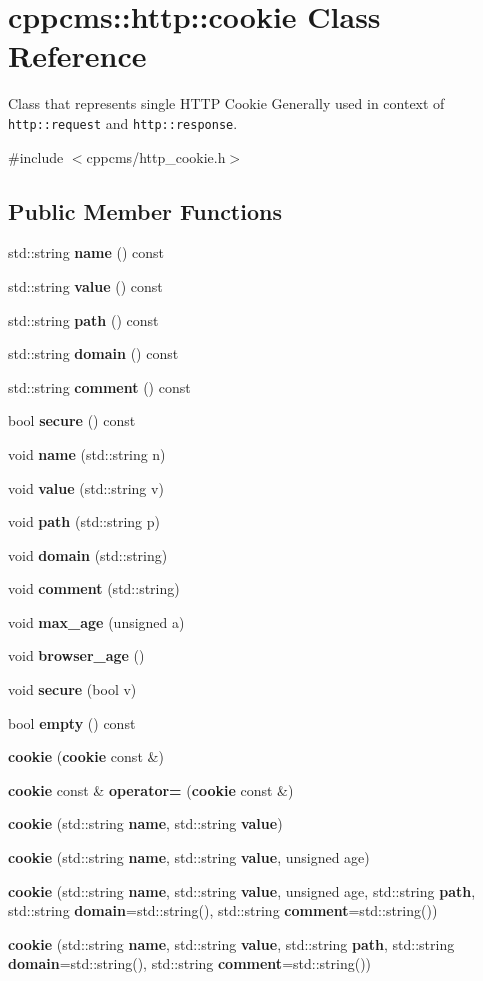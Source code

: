 \section{cppcms\-:\-:http\-:\-:cookie \-Class \-Reference}
\label{classcppcms_1_1http_1_1cookie}


\-Class that represents single \-H\-T\-T\-P \-Cookie \-Generally used in context of {\tt http\-::request} and {\tt http\-::response}.  




{\ttfamily \#include $<$cppcms/http\-\_\-cookie.\-h$>$}

\subsection*{\-Public \-Member \-Functions}
\begin{DoxyCompactItemize}
\item 
std\-::string {\bf name} () const 
\item 
std\-::string {\bf value} () const 
\item 
std\-::string {\bf path} () const 
\item 
std\-::string {\bf domain} () const 
\item 
std\-::string {\bf comment} () const 
\item 
bool {\bf secure} () const 
\item 
void {\bf name} (std\-::string n)
\item 
void {\bf value} (std\-::string v)
\item 
void {\bf path} (std\-::string p)
\item 
void {\bf domain} (std\-::string)
\item 
void {\bf comment} (std\-::string)
\item 
void {\bf max\-\_\-age} (unsigned a)
\item 
void {\bf browser\-\_\-age} ()
\item 
void {\bf secure} (bool v)
\item 
bool {\bf empty} () const 
\item 
{\bfseries cookie} ({\bf cookie} const \&)\label{classcppcms_1_1http_1_1cookie_a499a6443b52d30660481f06242907739}

\item 
{\bf cookie} const \& {\bfseries operator=} ({\bf cookie} const \&)\label{classcppcms_1_1http_1_1cookie_a14d9c1764f457f432532e288d41265ce}

\item 
{\bf cookie} (std\-::string {\bf name}, std\-::string {\bf value})
\item 
{\bf cookie} (std\-::string {\bf name}, std\-::string {\bf value}, unsigned age)
\item 
{\bf cookie} (std\-::string {\bf name}, std\-::string {\bf value}, unsigned age, std\-::string {\bf path}, std\-::string {\bf domain}=std\-::string(), std\-::string {\bf comment}=std\-::string())
\item 
{\bf cookie} (std\-::string {\bf name}, std\-::string {\bf value}, std\-::string {\bf path}, std\-::string {\bf domain}=std\-::string(), std\-::string {\bf comment}=std\-::string())
\end{DoxyCompactItemize}
